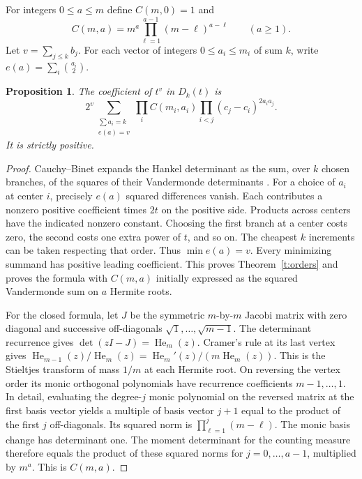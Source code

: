\documentclass[11pt]{article}
\newtheorem{proposition}[theorem]{Proposition}
\newcommand{\He}{\operatorname{He}}
\begin{document}
For integers $0\le a\le m$ define $C(m,0)=1$ and
\[
 C(m,a)=m^a\prod_{\ell=1}^{a-1}(m-\ell)^{a-\ell}\qquad(a\ge1).
\]
Let $v=\sum_{j\le k}b_j$. For each vector of integers $0\le a_i\le m_i$ of sum $k$, write $e(a)=\sum_i\binom{a_i}{2}$.
\begin{proposition}\label{p:leading}
The coefficient of $t^v$ in $D_k(t)$ is
\[
 2^v\sum_{\substack{\sum a_i=k\\ e(a)=v}}
     \prod_i C(m_i,a_i)\prod_{i<j}(c_j-c_i)^{2a_i a_j}.
\]
It is strictly positive.
\end{proposition}
\begin{proof}
Cauchy--Binet expands the Hankel determinant as the sum, over $k$ chosen branches, of the squares of their Vandermonde determinants \cite[Prop.~1]{roy}. For a choice of $a_i$ at center $i$, precisely $e(a)$ squared differences vanish. Each contributes a nonzero positive coefficient times $2t$ on the positive side. Products across centers have the indicated nonzero constant. Choosing the first branch at a center costs zero, the second costs one extra power of $t$, and so on. The cheapest $k$ increments can be taken respecting that order. Thus $\min e(a)=v$. Every minimizing summand has positive leading coefficient. This proves Theorem~\ref{t:orders} and proves the formula with $C(m,a)$ initially expressed as the squared Vandermonde sum on $a$ Hermite roots.

For the closed formula, let $J$ be the symmetric $m$-by-$m$ Jacobi matrix with zero diagonal and successive off-diagonals $\sqrt1,\ldots,\sqrt{m-1}$. The determinant recurrence gives $\det(zI-J)=\He_m(z)$. Cramer's rule at its last vertex gives $\He_{m-1}(z)/\He_m(z)=\He_m'(z)/(m\He_m(z))$. This is the Stieltjes transform of mass $1/m$ at each Hermite root. On reversing the vertex order its monic orthogonal polynomials have recurrence coefficients $m-1,\ldots,1$. In detail, evaluating the degree-$j$ monic polynomial on the reversed matrix at the first basis vector yields a multiple of basis vector $j+1$ equal to the product of the first $j$ off-diagonals. Its squared norm is $\prod_{\ell=1}^j(m-\ell)$. The monic basis change has determinant one. The moment determinant for the counting measure therefore equals the product of these squared norms for $j=0,\ldots,a-1$, multiplied by $m^a$. This is $C(m,a)$.
\end{proof}
\end{document}
